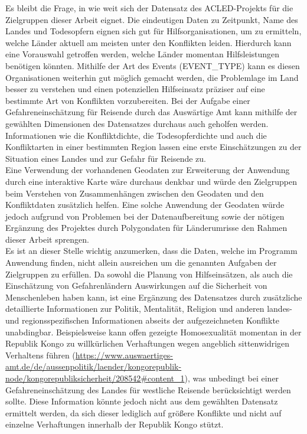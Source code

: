 \documentclass[usegeometry=true]{scrartcl}
\begin{document}
Es bleibt die Frage, in wie weit sich der Datensatz des ACLED-Projekts für die Zielgruppen dieser Arbeit eignet. Die eindeutigen Daten zu Zeitpunkt, Name des Landes und Todesopfern eignen sich gut für Hilfsorganisationen, um zu ermitteln, welche Länder aktuell am meisten unter den Konflikten leiden. Hierdurch kann eine Vorauswahl getroffen werden, welche Länder momentan Hilfsleistungen benötigen könnten. Mithilfe der Art des Events (EVENT\_TYPE) kann es diesen Organisationen weiterhin gut möglich gemacht werden, die Problemlage im Land besser zu verstehen und einen potenziellen Hilfseinsatz präziser auf eine bestimmte Art von Konflikten vorzubereiten. Bei der Aufgabe einer Gefahreneinschätzung für Reisende durch das Auswärtige Amt kann mithilfe der gewählten Dimensionen des Datensatzes durchaus auch geholfen werden. Informationen wie die Konfliktdichte, die Todesopferdichte und auch die Konfliktarten in einer bestimmten Region lassen eine erste Einschätzungen zu der Situation eines Landes und zur Gefahr für Reisende zu.\\ Eine Verwendung der vorhandenen Geodaten zur Erweiterung der Anwendung durch eine interaktive Karte wäre durchaus denkbar und würde den Zielgruppen beim Verstehen von Zusammenhängen zwischen den Geodaten und den Konfliktdaten zusätzlich helfen. Eine solche Anwendung der Geodaten würde jedoch aufgrund von Problemen bei der Datenaufbereitung sowie der nötigen Ergänzung des Projektes durch Polygondaten für Länderumrisse den Rahmen dieser Arbeit sprengen.\\ Es ist an dieser Stelle wichtig anzumerken, dass die Daten, welche im Programm Anwendung finden, nicht allein ausreichen um die genannten Aufgaben der Zielgruppen zu erfüllen. Da sowohl die Planung von Hilfseinsätzen, als auch die Einschätzung von Gefahrenländern Auswirkungen auf die Sicherheit von Menschenleben haben kann, ist eine Ergänzung des Datensatzes durch zusätzliche detaillierte Informationen zur Politik, Mentalität, Religion und anderen landes- und regionsspezifischen Informationen abseits der aufgezeichneten Konflikte unabdingbar. Beispielsweise kann offen gezeigte Homosexualität momentan in der Republik Kongo zu willkürlichen Verhaftungen wegen angeblich sittenwidrigen Verhaltens führen (\url{https://www.auswaertiges-amt.de/de/aussenpolitik/laender/kongorepublik-node/kongorepubliksicherheit/208542#content_1}), was unbedingt bei einer Gefahreneinschätzung des Landes für westliche Reisende berücksichtigt werden sollte. Diese Information könnte jedoch nicht aus dem gewählten Datensatz ermittelt werden, da sich dieser lediglich auf größere Konflikte und nicht auf einzelne Verhaftungen innerhalb der Republik Kongo stützt.
\end{document}
